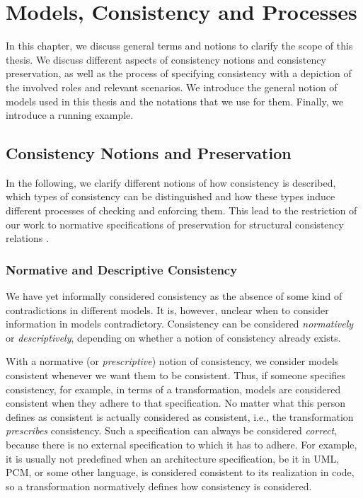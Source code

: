 \chapter{Models, Consistency and Processes
}
\label{chap:networks}

In this chapter, we discuss general terms and notions to clarify the scope of this thesis.
We discuss different aspects of consistency notions and consistency preservation, as well as the process of specifying consistency with a depiction of the involved roles and relevant scenarios.
We introduce the general notion of models used in this thesis and the notations that we use for them.
Finally, we introduce a running example.


\section{Consistency Notions and Preservation}
\label{chap:networks:notions:normative_descriptive}

In the following, we clarify different notions of how consistency is described, which types of consistency can be distinguished and how these types induce different processes of checking and enforcing them.
This lead to the restriction of our work to normative specifications of preservation for structural consistency relations .

\subsection{Normative and Descriptive Consistency}

We have yet informally considered consistency as the absence of some kind of contradictions in different models.
It is, however, unclear when to consider information in models contradictory.
Consistency can be considered \emph{normatively} or \emph{descriptively}, depending on whether a notion of consistency already exists.

With a normative (or \emph{prescriptive}) notion of consistency, we consider models consistent whenever we want them to be consistent.
Thus, if someone specifies consistency, for example, in terms of a transformation, models are considered consistent when they adhere to that specification.
No matter what this person defines as consistent is actually considered as consistent, i.e., the transformation \emph{prescribes} consistency.
Such a specification can always be considered \emph{correct}, because there is no external specification to which it has to adhere.
For example, it is usually not predefined when an architecture specification, be it in \gls{UML}, \gls{PCM}, or some other language, is considered consistent to its realization in code, so a transformation normatively defines how consistency is considered.

